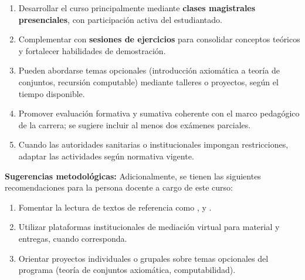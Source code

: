 \begin{refsection}
\begin{enumerate}
    \item Desarrollar el curso principalmente mediante \textbf{clases magistrales presenciales}, con participación activa del estudiantado.
    \item Complementar con \textbf{sesiones de ejercicios} para consolidar conceptos teóricos y fortalecer habilidades de demostración.
    \item Pueden abordarse temas opcionales (introducción axiomática a teoría de conjuntos, recursión computable) mediante talleres o proyectos, según el tiempo disponible.
    \item Promover evaluación formativa y sumativa coherente con el marco pedagógico de la carrera; se sugiere incluir al menos dos exámenes parciales.
    \item Cuando las autoridades sanitarias o institucionales impongan restricciones, adaptar las actividades según normativa vigente.
\end{enumerate}

\textbf{Sugerencias metodológicas:} Adicionalmente, se tienen las siguientes recomendaciones para la persona docente a cargo de este curso:

\begin{enumerate}
    \item Fomentar la lectura de textos de referencia como \cite{HiL19}, \cite{EFT94} y \cite{CL2000}.
    \item Utilizar plataformas institucionales de mediación virtual para material y entregas, cuando corresponda.
    \item Orientar proyectos individuales o grupales sobre temas opcionales del programa (teoría de conjuntos axiomática, computabilidad).
\end{enumerate}

\nocite{HiL19}
\nocite{CL2000}
\nocite{EFT94}
\nocite{Mar02}
\nocite{Poi00}
\nocite{Kun80}

\printcursosbibliography
\end{refsection}
